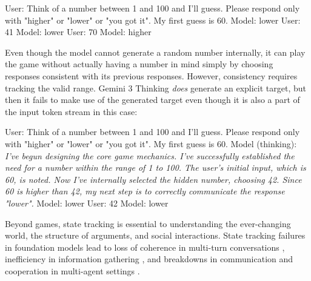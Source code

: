 \documentclass{llmxive}
\begin{document}
\begin{tcolorbox}[sharp corners, colback=white, colframe=black, fontupper=\ttfamily]
User: Think of a number between 1 and 100 and I'll guess. Please respond only with "higher" or "lower" or "you got it". My first guess is 60.\newline
Model: lower\newline
User: 41\newline
Model: lower\newline
User: 70\newline
Model: {higher}
\end{tcolorbox}
Even though the model cannot generate a random number internally, it can 
play the game without actually having a number in mind simply by choosing 
responses consistent with its previous responses. However, consistency requires
tracking the valid range.  
Gemini 3 Thinking \emph{does} generate an explicit target, but then it fails to make use of the generated target even though it is also a part of the input token stream in this case:
\begin{tcolorbox}[sharp corners, colback=white, colframe=black, fontupper=\ttfamily]
User: Think of a number between 1 and 100 and I'll guess. Please respond only with "higher" or "lower" or "you got it". My first guess is 60.\newline
Model (thinking): \emph{I've begun designing the core game mechanics. I've successfully established the need for a number within the range of 1 to 100. The user's initial input, which is 60, is noted. Now I've internally selected the hidden number, choosing 42. Since 60 is higher than 42, my next step is to correctly communicate the response "lower".}\newline
Model: lower\newline
User: 42\newline
Model: {lower}
\end{tcolorbox}
Beyond games, state tracking is essential to understanding the ever-changing world,
the structure of arguments, and social interactions. State tracking failures 
in foundation models lead to loss of coherence in multi-turn conversations 
\citep{laban2025},  inefficiency in information gathering  \citep{sawyer2025}, 
and  breakdowns in communication and cooperation in multi-agent settings 
\citep{davidson2025,khatua2026}.
\end{document}
